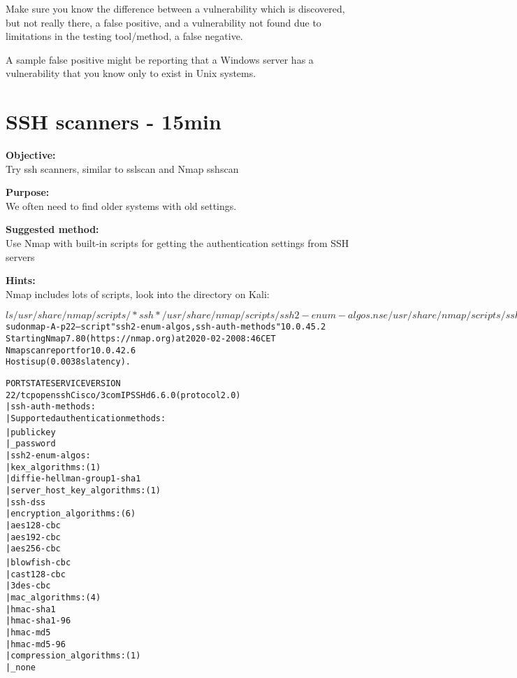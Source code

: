 \documentclass[a4paper,11pt,notitlepage]{report}
\begin{document}
Make sure you know the difference between a vulnerability which is discovered, but not really there, a false positive, and a vulnerability not found due to limitations in the testing tool/method, a false negative.

A sample false positive might be reporting that a Windows server has a vulnerability that you know only to exist in Unix systems.


\chapter{SSH scanners - 15min}
\label{ex:nmap-ssh-scanner}

{\bf Objective:}\\
Try ssh scanners, similar to sslscan and Nmap sshscan

{\bf Purpose:}\\
We often need to find older systems with old settings.

{\bf Suggested method:}\\
Use Nmap with built-in scripts for getting the authentication settings from SSH servers

{\bf Hints:}\\
Nmap includes lots of scripts, look into the directory on Kali:

\begin{alltt}\footnotesize
$ ls /usr/share/nmap/scripts/*ssh*
/usr/share/nmap/scripts/ssh2-enum-algos.nse   /usr/share/nmap/scripts/ssh-publickey-acceptance.nse
/usr/share/nmap/scripts/ssh-auth-methods.nse  /usr/share/nmap/scripts/ssh-run.nse
/usr/share/nmap/scripts/ssh-brute.nse	      /usr/share/nmap/scripts/sshv1.nse
/usr/share/nmap/scripts/ssh-hostkey.nse

$ sudo nmap -A -p 22 --script "ssh2-enum-algos,ssh-auth-methods" 10.0.45.2
Starting Nmap 7.80 ( https://nmap.org ) at 2020-02-20 08:46 CET
Nmap scan report for 10.0.42.6
Host is up (0.0038s latency).

PORT   STATE SERVICE VERSION
22/tcp open  ssh     Cisco/3com IPSSHd 6.6.0 (protocol 2.0)
| ssh-auth-methods:
|   Supported authentication methods:
|     publickey{\color{red}
|_    password}
| ssh2-enum-algos:
|   kex_algorithms: (1)
|       diffie-hellman-group1-sha1
|   server_host_key_algorithms: (1)
|       ssh-dss
|   encryption_algorithms: (6)
|       aes128-cbc
|       aes192-cbc
|       aes256-cbc
|       blowfish-cbc{\color{red}
|       cast128-cbc
|       3des-cbc}
|   mac_algorithms: (4)
|       hmac-sha1
|       hmac-sha1-96
|       hmac-md5
|       hmac-md5-96
|   compression_algorithms: (1)
|_      none
\end{alltt}
\end{document}
